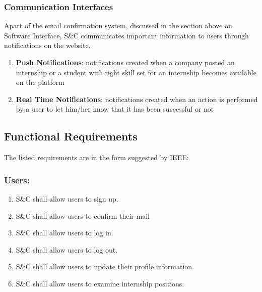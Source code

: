    \subsubsection{Communication Interfaces}
    Apart of the email confirmation system, discussed in the section above on Software Interface, S\&C communicates important information to users through notifications on the website.
    \begin{enumerate}
        \item  \textbf{Push Notifications}: notifications created when a company posted an internship or a student with right skill set for an internship becomes available on the platform
        \item \textbf{Real Time Notifications}: notifications created when an action is performed by a user to let him/her know that it has been successful or not
    \end{enumerate}
\subsection{Functional Requirements}
    The listed requirements are in the form suggested by IEEE\cite{502838}: 
    \newline
    \subsubsection*{Users:}
        \begin{enumerate}[label=\textbf{R\arabic*}]
            \item S\&C shall allow users to sign up.                  
            \item S\&C shall allow users to confirm their mail        
            \item S\&C shall allow users to log in.                   
            \item S\&C shall allow users to log out.                  
            \item S\&C shall allow users to update their profile information.      
            \item S\&C shall allow users to examine internship positions.
            \end{enumerate}
        
